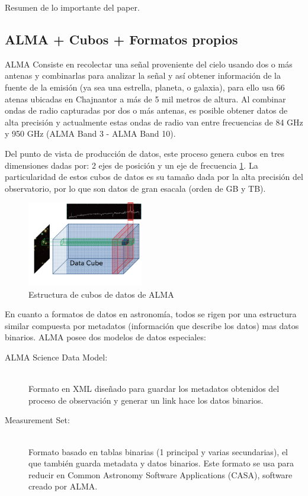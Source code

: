 Resumen de lo importante del paper.



\subsection{ALMA + Cubos + Formatos propios}

ALMA Consiste en recolectar una señal proveniente del cielo usando dos o más
antenas y combinarlas para analizar la señal y así obtener información de la
fuente de la emisión (ya sea una estrella, planeta, o galaxia), para ello usa
66 atenas ubicadas en Chajnantor a más de 5 mil metros de altura. Al combinar
ondas de radio capturadas por dos o más antenas, es posible obtener datos de
alta precisión y actualmente estas ondas de radio van entre frecuencias de 84
GHz y 950 GHz (ALMA Band 3 - ALMA Band 10). 

Del punto de vista de producción de datos, este proceso genera cubos en tres
dimensiones dadas por: 2 ejes de posición y un eje de frecuencia
\ref{fig:cube}. La particularidad de estos cubos de datos es su tamaño dada por
la alta precisión del observatorio, por lo que son datos de gran esacala (orden
de GB y TB).

\begin{figure}[ht]
    \centering
    \includegraphics[width=0.45\textwidth]{images/cube.png}
    \caption{Estructura de cubos de datos de ALMA \cite{dent20132}}
    \label{fig:cube}
\end{figure}

En cuanto a formatos de datos en astronomía, todos se rigen por una estructura
similar compuesta por metadatos (información que describe los datos) mas datos
binarios. ALMA posee dos modelos de datos especiales:
\begin{description}
    \item[ALMA Science Data Model:] \hfill \\
        Formato en XML diseñado para guardar los metadatos obtenidos del
        proceso de observación y generar un link hace los datos binarios.
    \item[Measurement Set:] \hfill \\
        Formato basado en tablas binarias (1 principal y varias secundarias),
        el que también guarda metadata y datos binarios. Este formato se usa
        para reducir en Common Astronomy Software Applications (CASA), software
        creado por ALMA.
\end{description}
